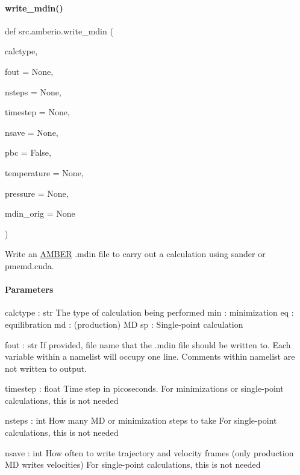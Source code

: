 \paragraph{\texorpdfstring{write\+\_\+mdin()}{write\_mdin()}}
{\footnotesize\ttfamily def src.\+amberio.\+write\+\_\+mdin (\begin{DoxyParamCaption}\item[{}]{calctype,  }\item[{}]{fout = {\ttfamily None},  }\item[{}]{nsteps = {\ttfamily None},  }\item[{}]{timestep = {\ttfamily None},  }\item[{}]{nsave = {\ttfamily None},  }\item[{}]{pbc = {\ttfamily False},  }\item[{}]{temperature = {\ttfamily None},  }\item[{}]{pressure = {\ttfamily None},  }\item[{}]{mdin\+\_\+orig = {\ttfamily None} }\end{DoxyParamCaption})}



Write an \hyperlink{classsrc_1_1amberio_1_1AMBER}{A\+M\+B\+ER} .mdin file to carry out a calculation using sander or pmemd.\+cuda. 

\paragraph*{Parameters }

calctype \+: str The type of calculation being performed \textquotesingle{}min\textquotesingle{} \+: minimization \textquotesingle{}eq\textquotesingle{} \+: equilibration \textquotesingle{}md\textquotesingle{} \+: (production) MD \textquotesingle{}sp\textquotesingle{} \+: Single-\/point calculation

fout \+: str If provided, file name that the .mdin file should be written to. Each variable within a namelist will occupy one line. Comments within namelist are not written to output.

timestep \+: float Time step in picoseconds. For minimizations or single-\/point calculations, this is not needed

nsteps \+: int How many MD or minimization steps to take For single-\/point calculations, this is not needed

nsave \+: int How often to write trajectory and velocity frames (only production MD writes velocities) For single-\/point calculations, this is not needed

